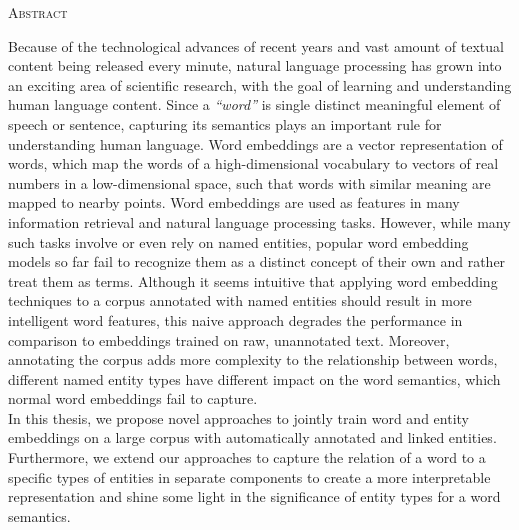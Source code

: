 \begin{center}
  \textsc{Abstract}
\end{center}
%
\noindent
%
Because of the technological advances of recent years and vast amount of textual content being released every minute, natural language processing has grown into an exciting area of scientific research, with the goal of learning and understanding human language content.
Since a \emph{``word''} is single distinct meaningful element of speech or sentence, capturing its semantics plays an important rule for understanding human language.
Word embeddings are a vector representation of words, which map the words of a high-dimensional vocabulary to vectors of real numbers in a low-dimensional space, such that words with similar meaning are mapped to nearby points.
Word embeddings are used as features in many information retrieval and natural language processing tasks. However, while many such tasks involve or even rely on named entities, popular word embedding models so far fail to recognize them as a distinct concept of their own and rather treat them as terms.
Although it seems intuitive that applying word embedding techniques to a corpus annotated with named entities should result in more intelligent word features, this naive approach  degrades the performance in comparison to embeddings trained on raw, unannotated text.
Moreover, annotating the corpus adds more complexity to the relationship between words, different named entity types have different impact on the word semantics, which normal word embeddings fail to capture.
\\
In this thesis, we propose novel approaches to jointly train word and entity embeddings on a large corpus with automatically annotated and linked entities.
Furthermore, we extend our approaches to capture the relation of a word to a specific types of entities in separate components to create a more interpretable representation and shine some light in the significance of entity types for a word semantics.
